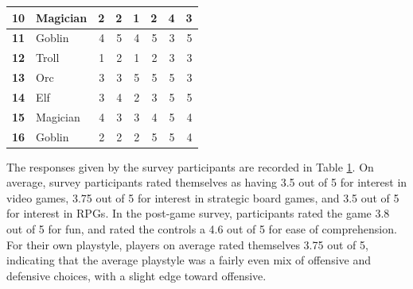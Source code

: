 \begin{table}[htbp]
\begin{tabular}{|rlrrrrrr|}
    \midrule
    \textbf{10} & Magician  & 2     & 2     & 1     & 2     & 4     & 3 \\
    \midrule
    \rowcolor[rgb]{ .851,  .851,  .851} \textbf{11} & Goblin & 4     & 5     & 4     & 5     & 3     & 5 \\
    \midrule
    \textbf{12} & Troll & 1     & 2     & 1     & 2     & 3     & 3 \\
    \midrule
    \rowcolor[rgb]{ .851,  .851,  .851} \textbf{13} & Orc   & 3     & 3     & 5     & 5     & 5     & 3 \\
    \midrule
    \textbf{14} & Elf   & 3     & 4     & 2     & 3     & 5     & 5 \\
    \midrule
    \rowcolor[rgb]{ .851,  .851,  .851} \textbf{15} & Magician  & 4     & 3     & 3     & 4     & 5     & 4 \\
    \midrule
    \textbf{16} & Goblin & 2     & 2     & 2     & 5     & 5     & 4 \\
    \bottomrule
    \end{tabular}%
  \label{tab:survey}%
\end{table}%

The responses given by the survey participants are recorded in Table \ref{tab:survey}. On average, survey participants rated themselves as having 3.5 out of 5 for interest in video games, 3.75 out of 5 for interest in strategic board games, and 3.5 out of 5 for interest in RPGs. In the post-game survey, participants rated the game 3.8 out of 5 for fun, and rated the controls a 4.6 out of 5 for ease of comprehension. For their own playstyle, players on average rated themselves 3.75 out of 5, indicating that the average playstyle was a fairly even mix of offensive and defensive choices, with a slight edge toward offensive.\\

